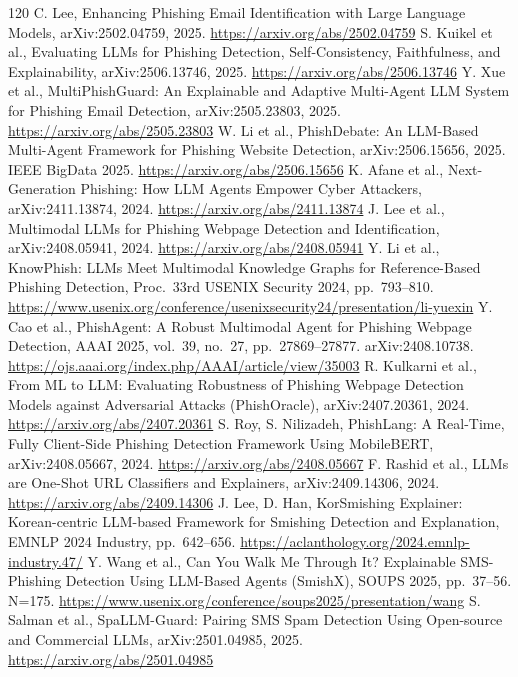 \documentclass[11pt,a4paper]{article}
\begin{document}
\begin{thebibliography}{120}
 C. Lee, Enhancing Phishing Email Identification with Large Language Models, arXiv:2502.04759, 2025. \url{https://arxiv.org/abs/2502.04759}
 S. Kuikel et al., Evaluating LLMs for Phishing Detection, Self-Consistency, Faithfulness, and Explainability, arXiv:2506.13746, 2025. \url{https://arxiv.org/abs/2506.13746}
 Y. Xue et al., MultiPhishGuard: An Explainable and Adaptive Multi-Agent LLM System for Phishing Email Detection, arXiv:2505.23803, 2025. \url{https://arxiv.org/abs/2505.23803}
 W. Li et al., PhishDebate: An LLM-Based Multi-Agent Framework for Phishing Website Detection, arXiv:2506.15656, 2025. IEEE BigData 2025. \url{https://arxiv.org/abs/2506.15656}
 K. Afane et al., Next-Generation Phishing: How LLM Agents Empower Cyber Attackers, arXiv:2411.13874, 2024. \url{https://arxiv.org/abs/2411.13874}
 J. Lee et al., Multimodal LLMs for Phishing Webpage Detection and Identification, arXiv:2408.05941, 2024. \url{https://arxiv.org/abs/2408.05941}
 Y. Li et al., KnowPhish: LLMs Meet Multimodal Knowledge Graphs for Reference-Based Phishing Detection, Proc.\ 33rd USENIX Security 2024, pp.~793--810. \url{https://www.usenix.org/conference/usenixsecurity24/presentation/li-yuexin}
 Y. Cao et al., PhishAgent: A Robust Multimodal Agent for Phishing Webpage Detection, AAAI 2025, vol.~39, no.~27, pp.~27869--27877. arXiv:2408.10738. \url{https://ojs.aaai.org/index.php/AAAI/article/view/35003}
 R. Kulkarni et al., From ML to LLM: Evaluating Robustness of Phishing Webpage Detection Models against Adversarial Attacks (PhishOracle), arXiv:2407.20361, 2024. \url{https://arxiv.org/abs/2407.20361}
 S. Roy, S. Nilizadeh, PhishLang: A Real-Time, Fully Client-Side Phishing Detection Framework Using MobileBERT, arXiv:2408.05667, 2024. \url{https://arxiv.org/abs/2408.05667}
 F. Rashid et al., LLMs are One-Shot URL Classifiers and Explainers, arXiv:2409.14306, 2024. \url{https://arxiv.org/abs/2409.14306}
 J. Lee, D. Han, KorSmishing Explainer: Korean-centric LLM-based Framework for Smishing Detection and Explanation, EMNLP 2024 Industry, pp.~642--656. \url{https://aclanthology.org/2024.emnlp-industry.47/}
 Y. Wang et al., Can You Walk Me Through It? Explainable SMS-Phishing Detection Using LLM-Based Agents (SmishX), SOUPS 2025, pp.~37--56. N=175. \url{https://www.usenix.org/conference/soups2025/presentation/wang}
 S. Salman et al., SpaLLM-Guard: Pairing SMS Spam Detection Using Open-source and Commercial LLMs, arXiv:2501.04985, 2025. \url{https://arxiv.org/abs/2501.04985}

\end{thebibliography}
\end{document}
